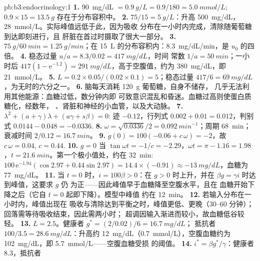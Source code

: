 \begin{solution}{pb:b3:endocrinology:1}
\textbf{1.} \qty{90}{mg/dL} $= \qty{0.9}{g/L} = 0.9/180 = \qty{5.0}{mmol/L}$;
$0.9\times 15 = \qty{13.5}{g}$ 存在于分布容积中。
\textbf{2.} $75/15 = \qty{5}{g/L}$：升高 \qty{500}{mg/dL}，
\qty{28}{mmol/L}。实际峰值远低于此，因为吸收
分布在一小时内完成，清除随葡萄糖到达即刻进行，且
肝脏在首过时摄取了很大一部分。
\textbf{3.} $\qty{75}{g}/\qty{60}{min} = \qty{1.25}{g/min}$；在
\qty{15}{L} 的分布容积内：\qty{8.3}{mg/dL/min}，是 $u_{0}$ 的四倍。
\textbf{4.} 稳态过量 $u/a = 8.3/0.02 = \qty{417}{mg/dL}$，时间
常数 $1/a = \qty{50}{min}$；一小时后 $417(1 -
\mathrm{e}^{-1.2}) = \qty{291}{mg/dL}$，高于空腹值，约为
\qty{380}{mg/dL}，即 \qty{21}{mmol/L}。
\textbf{5.} $L = 0.2\times 0.05/(0.02\times 0.1) = 5$；稳态过量
$417/6 = \qty{69}{mg/dL}$，为无时的六分之一。
\textbf{6.} 脑每天消耗 \qty{120}{g} 葡萄糖，自身不储存，
几乎无法利用其他能源：血糖过低，数分钟内即
可致意识混乱和昏迷。血糖过高则使蛋白质糖化，经数年，
、肾脏和神经的小血管，以及大动脉。
\textbf{7.} $\lambda^{2} + (a + \gamma)\lambda + (a\gamma + s\beta) = 0$:
迹 $-0.12$，行列式 $0.002 + 0.01 = 0.012$，判别式
$0.0144 - 0.048 = -0.0336$.
\textbf{8.} $\omega = \sqrt{0.0336}/2 = \qty{0.092}{min^{-1}}$；周期
\qty{68}{min}；衰减时间 $2/0.12 = \qty{16.7}{min}$。
\textbf{9.} $\dot g(0) = 100(-0.06 + c\,\omega) = -2$，故 $c\,\omega =
0.04$, $c = 0.44$.
\textbf{10.} $g = 0$ 当 $\tan\omega t = -1/c = -2.29$，$\omega t =
\pi - 1.16 = 1.98$，$t = \qty{21.6}{min}$。第一个极小值处，约在
\qty{32}{min}: $100\,\mathrm{e}^{-1.94}(\cos 2.97 + 0.44\sin 2.97) =
14.4\times(-0.91) \approx -\qty{13}{mg/dL}$，血糖为 \qty{77}{mg/dL}。
\textbf{11.} 当 $t = 0$ 时，$\dot i = 100\beta > 0$：在
$g > 0$ 时上升，并在 $\beta g = \gamma i$ 时达到峰值，这要求 $g$ 仍
为正——因此峰值早于血糖降至空腹水平，且在
血糖开始下降之后（它自 $t = 0$ 起即下降）。模型中峰值
约在 \qty{12}{min}。
\textbf{12.} 若输入分布在一小时内，峰值出现在
吸收与清除达到平衡之时，峰值更低、更晚（30--60 分钟）；
回落需等待吸收结束，因此需两小时；
超调因输入渐进而较小，故血糖低谷较轻。
\textbf{13.} $L = 2.5$。健康者 $g^{*} = (2/0.02)/6 = \qty{16.7}{mg/dL}$；
抵抗者 $100/3.5 = \qty{28.6}{mg/dL}$：升高约
\qty{12}{mg/dL}（\qty{0.7}{mmol/L}），空腹血糖约为
\qty{102}{mg/dL}，即 \qty{5.7}{mmol/L}——空腹血糖受损
的阈值。
\textbf{14.} $i^{*} = \beta g^{*}/\gamma$：健康者 $8.3$，抵抗者

\end{solution}
